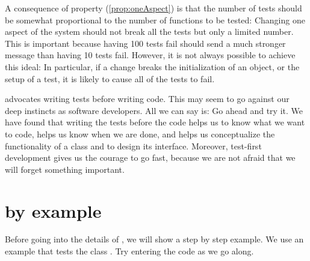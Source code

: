 \documentclass[a4paper,10pt,twoside]{book}
\begin{document}
A consequence of property (\ref{prop:oneAspect}) is that the number of tests should be somewhat proportional to the number of functions to be tested:
Changing one aspect of the system should not break all the tests but only a limited
number.
This is important because having 100 tests fail should send a much stronger message than having 10 tests fail.
However, it is not always possible to achieve this ideal: 
In particular, if a change breaks the initialization of an object, or the setup of a test, it is likely to cause all of the tests to fail.

 advocates writing tests before writing code.
This may seem to go against our deep instincts as software developers.  
All we can say is:
Go ahead and try it.
We have found that writing the tests before the code helps us to know what we want to code, helps us know when we are done, and helps us conceptualize the functionality of a class and to design its interface.
Moreover, test-first development gives us the courage to go fast, because we are not afraid that we will forget something important.




\section{\sunit by example}

Before going into the details of \SUnit, we will show a step by step example.
We use an example that tests the class .
Try entering the code as we go along.
\end{document}
